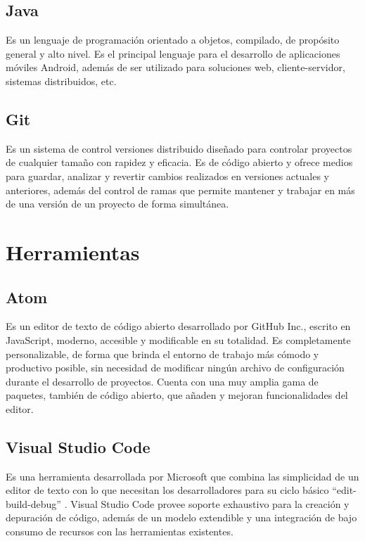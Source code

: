 \documentclass[12pt]{article}
\begin{document}
    \subsection{Java}
        Es un lenguaje de programación orientado a objetos, compilado, de propósito general y alto nivel. Es el principal lenguaje para el desarrollo de aplicaciones móviles Android, además de ser utilizado para soluciones web, cliente-servidor, sistemas distribuidos, etc.

    \subsection{Git}
        Es un sistema de control versiones distribuido diseñado para controlar proyectos de cualquier tamaño con rapidez y eficacia. Es de código abierto y ofrece medios para guardar, analizar y revertir cambios realizados en versiones actuales y anteriores, además del control de ramas que permite mantener y trabajar en más de una versión de un proyecto de forma simultánea.

\section{Herramientas} 
    \subsection{Atom}
        Es un editor de texto de código abierto desarrollado por GitHub Inc., escrito en JavaScript, moderno, accesible y modificable en su totalidad. Es completamente personalizable, de forma que brinda el entorno de trabajo más cómodo y productivo posible, sin necesidad de modificar ningún archivo de configuración durante el desarrollo de proyectos. Cuenta con una muy amplia gama de paquetes, también de código abierto, que añaden y mejoran funcionalidades del editor.

    \subsection{Visual Studio Code}
        Es una herramienta desarrollada por Microsoft que combina las simplicidad de un editor de texto con lo que necesitan los desarrolladores para su ciclo básico ``edit-build-debug'' . Visual Studio Code provee soporte exhaustivo para la creación y depuración de código, además de un modelo extendible y una integración de bajo consumo de recursos con las herramientas existentes.
\end{document}
